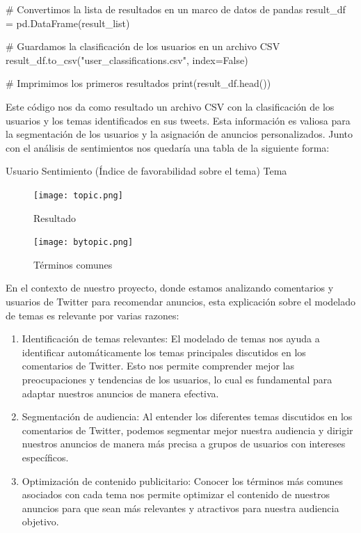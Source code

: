 \documentclass[
  letterpaper,
  DIV=11,
  numbers=noendperiod]{scrartcl}
\newenvironment{Shaded}{\begin{snugshade}}{\end{snugshade}}
\newcommand{\BuiltInTok}[1]{\textcolor[rgb]{0.00,0.23,0.31}{#1}}
\newcommand{\CommentTok}[1]{\textcolor[rgb]{0.37,0.37,0.37}{#1}}
\newcommand{\NormalTok}[1]{\textcolor[rgb]{0.00,0.23,0.31}{#1}}
\newcommand{\OperatorTok}[1]{\textcolor[rgb]{0.37,0.37,0.37}{#1}}
\newcommand{\StringTok}[1]{\textcolor[rgb]{0.13,0.47,0.30}{#1}}
\newcommand{\VariableTok}[1]{\textcolor[rgb]{0.07,0.07,0.07}{#1}}
\begin{document}
\begin{Shaded}
\begin{Highlighting}[]
\CommentTok{\# Convertimos la lista de resultados en un marco de datos de pandas}
\NormalTok{result\_df }\OperatorTok{=}\NormalTok{ pd.DataFrame(result\_list)}

\CommentTok{\# Guardamos la clasificación de los usuarios en un archivo CSV}
\NormalTok{result\_df.to\_csv(}\StringTok{"user\_classifications.csv"}\NormalTok{, index}\OperatorTok{=}\VariableTok{False}\NormalTok{)}

\CommentTok{\# Imprimimos los primeros resultados}
\BuiltInTok{print}\NormalTok{(result\_df.head())}
\end{Highlighting}
\end{Shaded}

Este código nos da como resultado un archivo CSV con la clasificación de
los usuarios y los temas identificados en sus tweets. Esta información
es valiosa para la segmentación de los usuarios y la asignación de
anuncios personalizados. Junto con el análisis de sentimientos nos
quedaría una tabla de la siguiente forma:

Usuario \textbar{} Sentimiento (Índice de favorabilidad sobre el tema)
\textbar{} Tema \textbar{}

\begin{figure}[H]

{\centering \texttt{[image: topic.png]}

}

\caption{Resultado}

\end{figure}%

\begin{figure}[htbp]
    \centering
    \texttt{[image: bytopic.png]}
    \caption{Términos comunes}
    \label{fig:terminos_comunes}
\end{figure}

En el contexto de nuestro proyecto, donde estamos analizando comentarios
y usuarios de Twitter para recomendar anuncios, esta explicación sobre
el modelado de temas es relevante por varias razones:

\begin{enumerate}
\def\labelenumi{\arabic{enumi}.}
\item
  Identificación de temas relevantes: El modelado de temas nos ayuda a
  identificar automáticamente los temas principales discutidos en los
  comentarios de Twitter. Esto nos permite comprender mejor las
  preocupaciones y tendencias de los usuarios, lo cual es fundamental
  para adaptar nuestros anuncios de manera efectiva.
\item
  Segmentación de audiencia: Al entender los diferentes temas discutidos
  en los comentarios de Twitter, podemos segmentar mejor nuestra
  audiencia y dirigir nuestros anuncios de manera más precisa a grupos
  de usuarios con intereses específicos.
\item
  Optimización de contenido publicitario: Conocer los términos más
  comunes asociados con cada tema nos permite optimizar el contenido de
  nuestros anuncios para que sean más relevantes y atractivos para
  nuestra audiencia objetivo.
\end{enumerate}
\end{document}
